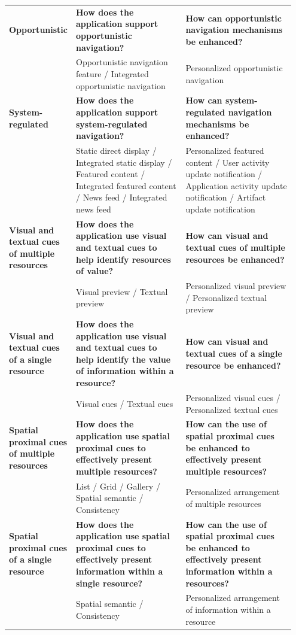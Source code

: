 \documentclass{sigchi}
\begin{document}
{\begin{table}[htbp]
\begin{tabular}{|p{0.15\linewidth}| p{0.40\linewidth}| p{0.40\linewidth}|}
\textbf{Opportunistic}          & \textbf{How does the application support opportunistic navigation?}& \textbf{How can opportunistic navigation mechanisms be enhanced?}\\
& Opportunistic navigation feature / Integrated opportunistic navigation & Personalized opportunistic navigation \\
\textbf{System-regulated}       &\textbf{How does the application support system-regulated navigation?} & \textbf{How can system-regulated navigation mechanisms be enhanced?}\\
& Static direct display / Integrated static display / Featured content / Integrated featured content / News feed / Integrated news feed & Personalized featured content / User activity update notification / Application activity update notification / Artifact update notification \\
\textbf{Visual and textual cues of multiple resources} & \textbf{How does the application use visual and textual cues to help identify resources of value?} & \textbf{How can visual and textual cues of multiple resources be enhanced?}\\
& Visual preview / Textual preview & Personalized visual preview / Personalized textual preview \\
\textbf{Visual and textual cues of a single resource} & \textbf{How does the application use visual and textual cues to help identify the value of information within a resource?} & \textbf{How can visual and textual cues of a single resource be enhanced?}\\
& Visual cues / Textual cues & Personalized visual cues / Personalized textual cues \\                
\textbf{Spatial proximal cues of multiple resources} & \textbf{How does the application use spatial proximal cues to effectively present multiple resources?} & \textbf{How can the use of spatial proximal cues be enhanced to effectively present multiple resources?}\\
& List / Grid / Gallery / Spatial semantic / Consistency & Personalized arrangement of multiple resources\\
\textbf{Spatial proximal cues of a single resource} & \textbf{How does the application use spatial proximal cues to effectively present information within a single resource?} & \textbf{How can the use of spatial proximal cues be enhanced to effectively present information within a resources?}\\
& Spatial semantic / Consistency & Personalized arrangement of information within a resource  \\ 

\end{tabular}
\end{table}}
\end{document}
